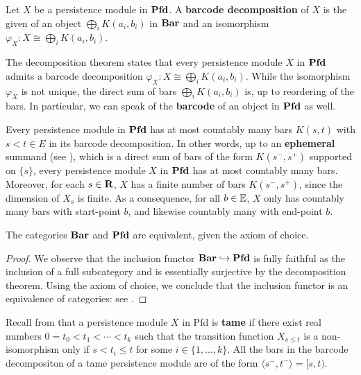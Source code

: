 \begin{definition}
\label{C!D:barcode-decomp}
  Let $X$ be a persistence module in $\Pfd$. A \textbf{barcode decomposition} of $X$ is the given of an object $\bigoplus_i K(a_i, b_i)$ in $\Bar$ and an isomorphism $\varphi_X \colon X \cong \bigoplus_i K(a_i, b_i)$.
\end{definition}

\begin{remark}
  The decomposition theorem \cite{CrawleyBoevey2015,BotnanCrawleyBoevey2020} states that every persistence module  $X$ in $\Pfd$ admits a barcode decomposition  $\varphi_X \colon X \cong \bigoplus_i K(a_i, b_i)$. While the isomorphism $\varphi_X$ is not unique, the direct sum of bars $\bigoplus_i K(a_i, b_i)$ is, up to reordering of the bars. In particular, we can speak of the \textbf{barcode} of an object in $\Pfd$ as well.  
\end{remark}

\begin{remark}
\label{C!R:ephemeral}
  Every persistence module in $\Pfd$ has at most countably many bars $K(s, t)$ with $s < t \in E$ in its barcode decomposition. In other words, up to an \textbf{ephemeral} summand (see \cite{CdSGO2016}), which is a direct sum of bars of the form $K(s^-, s^+)$ supported on $\{s\}$, every persistence module $X$ in $\Pfd$ has at most countably many bars. 
  Moreover, for each $s \in \R$, $X$ has a finite number of bars $K(s^-, s^+)$, since the dimension of $X_s$ is finite. As a consequence, for all $b \in \E$, $X$ only has countably many bars with start-point $b$, and likewise countably many with end-point $b$.
\end{remark}


\begin{proposition}
  The categories $\Bar$ and $\Pfd$ are equivalent, given the axiom of choice.
\end{proposition}

\begin{proof}
  We observe that the inclusion functor $\Bar \hookrightarrow \Pfd$ is fully faithful as the inclusion of a full subcategory and is essentially surjective by the decomposition theorem. Using the axiom of choice, we conclude that the inclusion functor is an equivalence of categories: see \cite[\href{C!https://stacks.math.columbia.edu/tag/02C3}{Lemma 02C3}]{stacks-project}.
\end{proof}

Recall from \cite{AGRS2025} that a persistence module $X$ in Pfd is \textbf{tame} if there exist real numbers $0=t_0<t_1<\cdots <t_k$ such that the transition function $X_{s\le t}$ is a non-isomorphism only if $s<t_i \le t$ for some $i\in \{ 1,\ldots ,k\}$.  
All the bars in the barcode decompositon of a tame persistence module are of the form $\langle s^-, t^- \rangle = [s, t)$.


